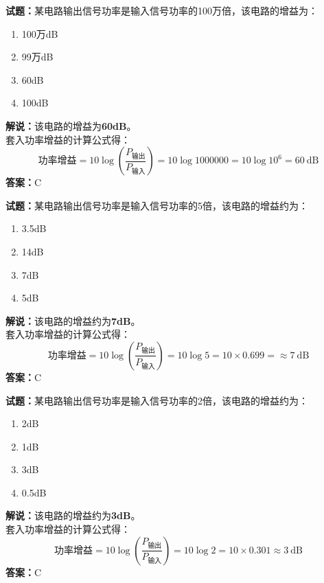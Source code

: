 \documentclass{ctexbook}
\begin{document}
\bigskip




\noindent\textbf{试题：}某电路输出信号功率是输入信号功率的100万倍，该电路的增益为：
\begin{enumerate}[leftmargin=3em]
\item 100万dB
\item 99万dB
\item 60dB
\item 100dB
\end{enumerate}
\noindent\textbf{解说：}该电路的增益为\textbf{60dB}。\\
套入功率增益的计算公式得：
$$\mbox{功率增益}=10 \log \left( {\frac{P_{ \mbox{输出} }}{P_{ \mbox{输入} }}} \right)=10 \log 1000000 = 10 \log 10^6 = 60 \ \mathrm{dB}$$
\noindent\textbf{答案：}C

\bigskip




\noindent\textbf{试题：}某电路输出信号功率是输入信号功率的5倍，该电路的增益约为：
\begin{enumerate}[leftmargin=3em]
\item 3.5dB
\item 14dB
\item 7dB
\item 5dB
\end{enumerate}
\noindent\textbf{解说：}该电路的增益约为\textbf{7dB}。\\
套入功率增益的计算公式得：
$$\mbox{功率增益}=10 \log \left( {\frac{P_{ \mbox{输出} }}{P_{ \mbox{输入} }}} \right)=10 \log 5 = 10 \times 0.699 = \approx 7 \ \mathrm{dB}$$
\noindent\textbf{答案：}C

\bigskip




\noindent\textbf{试题：}某电路输出信号功率是输入信号功率的2倍，该电路的增益约为：
\begin{enumerate}[leftmargin=3em]
\item 2dB
\item 1dB
\item 3dB
\item 0.5dB
\end{enumerate}
\noindent\textbf{解说：}该电路的增益约为\textbf{3dB}。\\
套入功率增益的计算公式得：
$$\mbox{功率增益}=10 \log \left( {\frac{P_{ \mbox{输出} }}{P_{ \mbox{输入} }}} \right)=10 \log 2 = 10 \times 0.301 \approx 3 \ \mathrm{dB}$$
\noindent\textbf{答案：}C

\bigskip
\end{document}
